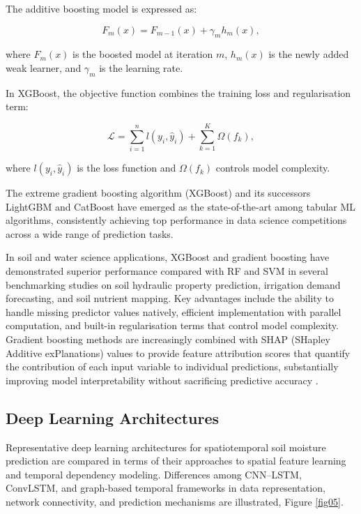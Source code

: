 \documentclass[land,article,submit,pdftex,moreauthors]{Definitions/mdpi}
\numberwithin{equation}{section}
\begin{document}
The additive boosting model is expressed as:

\begin{equation}
F_m(x)=F_{m-1}(x)+\gamma_m h_m(x),
\end{equation}

where $F_m(x)$ is the boosted model at iteration $m$, $h_m(x)$ is the newly added weak learner, and $\gamma_m$ is the learning rate.

In XGBoost, the objective function combines the training loss and regularisation term:

\begin{equation}
\mathcal{L}=
\sum_{i=1}^{n}
l(y_i,\hat{y}_i)
+
\sum_{k=1}^{K}\Omega(f_k),
\end{equation}

where $l(y_i,\hat{y}_i)$ is the loss function and $\Omega(f_k)$ controls model complexity.

The extreme gradient boosting algorithm (XGBoost) \citep{chen2016xgboost} and its successors LightGBM and CatBoost have emerged as the state-of-the-art among tabular ML algorithms, consistently achieving top performance in data science competitions across a wide range of prediction tasks.

In soil and water science applications, XGBoost and gradient boosting have demonstrated superior performance compared with RF and SVM in several benchmarking studies on soil hydraulic property prediction, irrigation demand forecasting, and soil nutrient mapping. Key advantages include the ability to handle missing predictor values natively, efficient implementation with parallel computation, and built-in regularisation terms that control model complexity. Gradient boosting methods are increasingly combined with SHAP (SHapley Additive exPlanations) values \citep{lundberg2017unified} to provide feature attribution scores that quantify the contribution of each input variable to individual predictions, substantially improving model interpretability without sacrificing predictive accuracy \citep{Lemenkova202518, Lemenkova202505}.

\subsection{Deep Learning Architectures}
Representative deep learning architectures for spatiotemporal soil moisture prediction are compared in terms of their approaches to spatial feature learning and temporal dependency modeling. Differences among CNN–LSTM, ConvLSTM, and graph-based temporal frameworks in data representation, network connectivity, and prediction mechanisms are illustrated, Figure \ref{fig05}.
\end{document}
